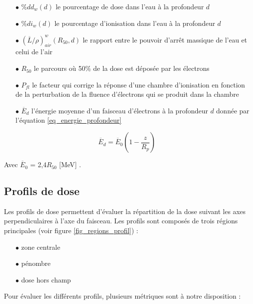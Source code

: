 \documentclass{article}
\begin{document}
\begin{itemize}
  \item[$\bullet$] $\%dd_w(d)$ le pourcentage de dose dans l'eau à la profondeur $d$
  \item[$\bullet$] $\%di_w(d)$ le pourcentage d'ionisation dans l'eau à la profondeur $d$
  \item[$\bullet$] $(\overline{L}/\rho)^w_{air}(R_{50}, d)$ le rapport entre le pouvoir d'arrêt massique de l'eau et celui de l'air
  \item[$\bullet$] $R_{50}$ le parcours où 50\% de la dose est déposée par les électrons
  \item[$\bullet$] $P_{fl}$ le facteur qui corrige la réponse d'une chambre d'ionisation en fonction de la perturbation de la fluence d'électrons qui se produit dans la chambre
  \item[$\bullet$] $\overline{E}_d$ l'énergie moyenne d'un faisceau d'électrons à la profondeur $d$ donnée par l'équation \ref*{eq_energie_profondeur}
\end{itemize}

\begin{equation}
  \overline{E}_d = \overline{E}_0 \left( 1 - \dfrac{z}{R_p} \right)
  \label{eq_energie_profondeur}
\end{equation}

Avec $\overline{E}_0$ = 2,4$R_{50}$ [MeV] \cite{fm1991clinical}\cite{gerbi2009recommendations}.

\subsection{Profils de dose}

Les profils de dose permettent d'évaluer la répartition de la dose suivant les axes perpendiculaires à l'axe du faisceau. Les profils sont composés de trois régions principales (voir figure \ref*{fig_regions_profil}) :

\begin{itemize}
  \item[$\bullet$] zone centrale
  \item[$\bullet$] pénombre
  \item[$\bullet$] dose hors champ
\end{itemize}

Pour évaluer les différents profils, plusieurs métriques sont à notre disposition :
\end{document}
